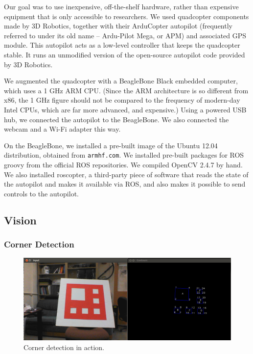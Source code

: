 \documentclass[10pt]{scrartcl} %
\begin{document}
Our goal was to use inexpensive, off-the-shelf hardware, rather than expensive
equipment that is only accessible to researchers. We used quadcopter components
made by 3D Robotics, together with their ArduCopter autopilot (frequently
referred to under its old name -- Ardu-Pilot Mega, or APM) and associated GPS
module. This autopilot acts as a low-level controller that keeps the quadcopter
stable. It runs an unmodified version of the open-source autopilot code
provided by 3D Robotics.

We augmented the quadcopter with a BeagleBone Black embedded computer, which
uses a 1 GHz ARM CPU. (Since the ARM architecture is so different from x86,
the 1 GHz figure should not be compared to the frequency of modern-day Intel
CPUs, which are far more advanced, and expensive.) Using a powered USB hub, we
connected the autopilot to the BeagleBone. We also connected the webcam and a
Wi-Fi adapter this way.


On the BeagleBone, we installed a pre-built image of the Ubuntu 12.04
distribution, obtained from {\tt armhf.com}. We installed pre-built packages
for ROS groovy from the official ROS repositories. We compiled OpenCV 2.4.7 by
hand. We also installed roscopter, a third-party piece of software that reads
the state of the autopilot and makes it available via ROS, and also makes it
possible to send controls to the autopilot.


\subsection{Vision}

\subsubsection{Corner Detection}

\begin{figure}[h]
    \centering
    \includegraphics[width=\textwidth]{images/corners.png}
    \caption{Corner detection in action.}
    \label{fig:corners}
\end{figure}
\end{document}
